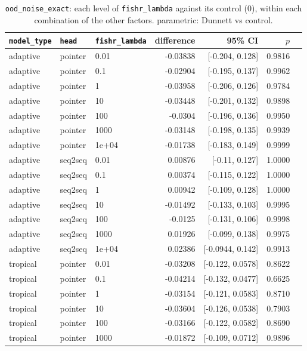 \documentclass[10pt]{article}
\begin{document}
{\small
\begin{longtable}{lllrrrl}
\caption{\texttt{ood\_noise\_exact}: each level of \texttt{fishr\_lambda} against its control (0), within each combination of the other factors. parametric: Dunnett vs control.}\label{tab:control-ood_noise_exact}\\
\toprule
\texttt{model\_type} & \texttt{head} & \texttt{fishr\_lambda} & difference & 95\% CI & $p$ & \\
\midrule
\endhead
adaptive & pointer & 0.01 & -0.03838 & [-0.204, 0.128] & 0.9816 & \\
adaptive & pointer & 0.1 & -0.02904 & [-0.195, 0.137] & 0.9962 & \\
adaptive & pointer & 1 & -0.03958 & [-0.206, 0.126] & 0.9784 & \\
adaptive & pointer & 10 & -0.03448 & [-0.201, 0.132] & 0.9898 & \\
adaptive & pointer & 100 & -0.0304 & [-0.196, 0.136] & 0.9950 & \\
adaptive & pointer & 1000 & -0.03148 & [-0.198, 0.135] & 0.9939 & \\
adaptive & pointer & 1e+04 & -0.01738 & [-0.183, 0.149] & 0.9999 & \\
adaptive & seq2seq & 0.01 & 0.00876 & [-0.11, 0.127] & 1.0000 & \\
adaptive & seq2seq & 0.1 & 0.00374 & [-0.115, 0.122] & 1.0000 & \\
adaptive & seq2seq & 1 & 0.00942 & [-0.109, 0.128] & 1.0000 & \\
adaptive & seq2seq & 10 & -0.01492 & [-0.133, 0.103] & 0.9995 & \\
adaptive & seq2seq & 100 & -0.0125 & [-0.131, 0.106] & 0.9998 & \\
adaptive & seq2seq & 1000 & 0.01926 & [-0.099, 0.138] & 0.9975 & \\
adaptive & seq2seq & 1e+04 & 0.02386 & [-0.0944, 0.142] & 0.9913 & \\
tropical & pointer & 0.01 & -0.03208 & [-0.122, 0.0578] & 0.8622 & \\
tropical & pointer & 0.1 & -0.04214 & [-0.132, 0.0477] & 0.6625 & \\
tropical & pointer & 1 & -0.03154 & [-0.121, 0.0583] & 0.8710 & \\
tropical & pointer & 10 & -0.03604 & [-0.126, 0.0538] & 0.7903 & \\
tropical & pointer & 100 & -0.03166 & [-0.122, 0.0582] & 0.8690 & \\
tropical & pointer & 1000 & -0.01872 & [-0.109, 0.0712] & 0.9896 & \\

\end{longtable}}
\end{document}
